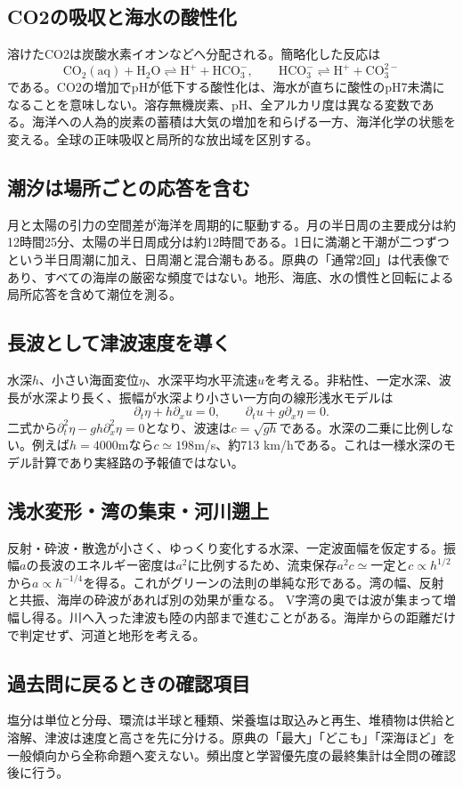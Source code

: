 \subsection{CO2の吸収と海水の酸性化}
\label{theory:ocean:carbon}
溶けたCO2は炭酸水素イオンなどへ分配される。簡略化した反応は
\[
 \mathrm{CO_2(aq)+H_2O\rightleftharpoons H^++HCO_3^-},\qquad
 \mathrm{HCO_3^-\rightleftharpoons H^++CO_3^{2-}}
\]
である。CO2の増加でpHが低下する酸性化は、海水が直ちに酸性のpH7未満になることを意味しない。溶存無機炭素、pH、全アルカリ度は異なる変数である。海洋への人為的炭素の蓄積は大気の増加を和らげる一方、海洋化学の状態を変える。全球の正味吸収と局所的な放出域を区別する。\cite{noaa_carbon_chemistry}

\subsection{潮汐は場所ごとの応答を含む}
\label{theory:ocean:tides}
月と太陽の引力の空間差が海洋を周期的に駆動する。月の半日周の主要成分は約12時間25分、太陽の半日周成分は約12時間である。1日に満潮と干潮が二つずつという半日周潮に加え、日周潮と混合潮もある。原典の「通常2回」は代表像であり、すべての海岸の厳密な頻度ではない。地形、海底、水の慣性と回転による局所応答を含めて潮位を測る。\cite{noaa_tidal_patterns}

\subsection{長波として津波速度を導く}
\label{theory:ocean:tsunami}
水深\(h\)、小さい海面変位\(\eta\)、水深平均水平流速\(u\)を考える。非粘性、一定水深、波長が水深より長く、振幅が水深より小さい一方向の線形浅水モデルは
\[
 \partial_t\eta+h\partial_xu=0,\qquad
 \partial_tu+g\partial_x\eta=0.
\]
二式から\(\partial_t^2\eta-gh\partial_x^2\eta=0\)となり、波速は\(c=\sqrt{gh}\)である。水深の二乗に比例しない。例えば\(h=4000\)mなら\(c\simeq198\)m/s、約713 km/hである。これは一様水深のモデル計算であり実経路の予報値ではない。\cite{jma_tsunami_prediction}

\subsection{浅水変形・湾の集束・河川遡上}
\label{theory:ocean:shoaling}
反射・砕波・散逸が小さく、ゆっくり変化する水深、一定波面幅を仮定する。振幅\(a\)の長波のエネルギー密度は\(a^2\)に比例するため、流束保存\(a^2c\simeq\text{一定}\)と\(c\propto h^{1/2}\)から\(a\propto h^{-1/4}\)を得る。これがグリーンの法則の単純な形である。湾の幅、反射と共振、海岸の砕波があれば別の効果が重なる。\cite{jma_tsunami_prediction}
V字湾の奥では波が集まって増幅し得る。川へ入った津波も陸の内部まで進むことがある。海岸からの距離だけで判定せず、河道と地形を考える。\cite{jma_tsunami_generation,jma_tsunami_rivers}

\subsection{過去問に戻るときの確認項目}
塩分は単位と分母、環流は半球と種類、栄養塩は取込みと再生、堆積物は供給と溶解、津波は速度と高さを先に分ける。原典の「最大」「どこも」「深海ほど」を一般傾向から全称命題へ変えない。頻出度と学習優先度の最終集計は全問の確認後に行う。
